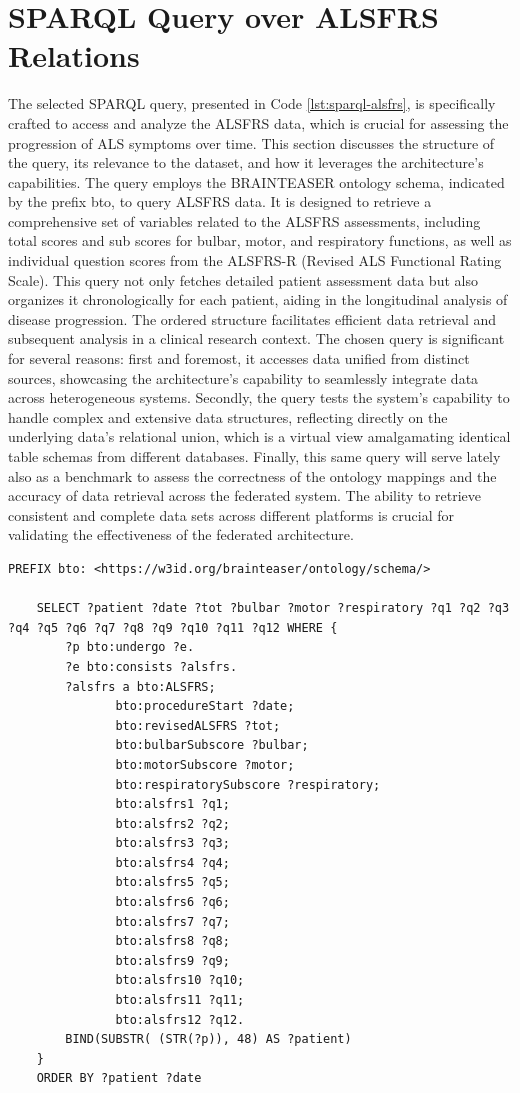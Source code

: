 \section{SPARQL Query over ALSFRS Relations}
The selected \ac{SPARQL} query, presented in Code \ref{lst:sparql-alsfrs}, is specifically crafted to access and analyze the \ac{ALSFRS} data, which is crucial for assessing the progression of \ac{ALS} symptoms over time. This section discusses the structure of the query, its relevance to the dataset, and how it leverages the architecture's capabilities. The query employs the BRAINTEASER ontology schema, indicated by the prefix bto, to query \ac{ALSFRS} data. It is designed to retrieve a comprehensive set of variables related to the \ac{ALSFRS} assessments, including total scores and sub scores for bulbar, motor, and respiratory functions, as well as individual question scores from the \ac{ALSFRS}-R (Revised \ac{ALS} Functional Rating Scale). 
This query not only fetches detailed patient assessment data but also organizes it chronologically for each patient, aiding in the longitudinal analysis of disease progression. The ordered structure facilitates efficient data retrieval and subsequent analysis in a clinical research context.
The chosen query is significant for several reasons: first and foremost, it accesses data unified from distinct sources, showcasing the architecture's capability to seamlessly integrate data across heterogeneous systems. Secondly, the query tests the system's capability to handle complex and extensive data structures, reflecting directly on the underlying data's relational union, which is a virtual view amalgamating identical table schemas from different databases. Finally, this same query will serve lately also as a benchmark to assess the correctness of the ontology mappings and the accuracy of data retrieval across the federated system. The ability to retrieve consistent and complete data sets across different platforms is crucial for validating the effectiveness of the federated architecture.
\begin{lstlisting}[language=SPARQL, caption={SPARQL query on ALSFRS visits performed by patients over the BRAINTEASER ontology vocabulary}, label={lst:sparql-alsfrs}]
    PREFIX bto: <https://w3id.org/brainteaser/ontology/schema/>
    
    SELECT ?patient ?date ?tot ?bulbar ?motor ?respiratory ?q1 ?q2 ?q3 ?q4 ?q5 ?q6 ?q7 ?q8 ?q9 ?q10 ?q11 ?q12 WHERE { 
        ?p bto:undergo ?e.
        ?e bto:consists ?alsfrs.
        ?alsfrs a bto:ALSFRS;
               bto:procedureStart ?date;
               bto:revisedALSFRS ?tot;
               bto:bulbarSubscore ?bulbar;
               bto:motorSubscore ?motor;
               bto:respiratorySubscore ?respiratory;
               bto:alsfrs1 ?q1;
               bto:alsfrs2 ?q2;
               bto:alsfrs3 ?q3;
               bto:alsfrs4 ?q4;
               bto:alsfrs5 ?q5;
               bto:alsfrs6 ?q6;
               bto:alsfrs7 ?q7;
               bto:alsfrs8 ?q8;
               bto:alsfrs9 ?q9;
               bto:alsfrs10 ?q10;
               bto:alsfrs11 ?q11;
               bto:alsfrs12 ?q12.
        BIND(SUBSTR( (STR(?p)), 48) AS ?patient)
    } 
    ORDER BY ?patient ?date
\end{lstlisting}

